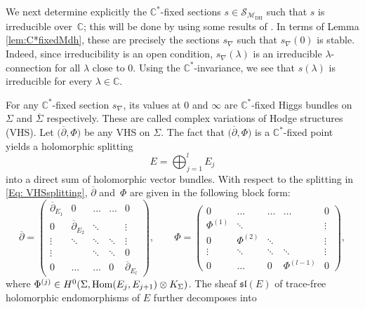 \documentclass[pdftex]{sigma}
\numberwithin{equation}{section}
\theoremstyle{definition}
\newcommand\C{{\mathbb C}}
\begin{document}
We next determine explicitly the $\C^*$-fixed sections $s \in \mathcal{S}_{\mathcal{M}_{\mathrm{DH}}}$ such that $s$
is irreducible over~$\C$; this will be done by using some results of \cite{CollierWentworth}. In terms of Lemma
\ref{lem:C*fixedMdh}, these are precisely the sections $s_\nabla$ such that $s_\nabla(0)$ is
stable. Indeed, since irreducibility is an open condition, $s_\nabla(\lambda)$ is an
irreducible $\lambda$-connection for all $\lambda$ close to $0$. Using the $\C^*$-invariance, we
see that $s(\lambda)$ is irreducible for every $\lambda \in \C$.

For any $\C^*$-fixed section $s_\nabla$, its values at $0$ and $\infty$ are $\C^*$-fixed Higgs
bundles on $\Sigma$ and $\overline{\Sigma}$ respectively.
These are called complex variations of Hodge structures (VHS).
Let $\bigl({\overline{\partial}}, \Phi\bigr)$ be any VHS on $\Sigma$.
The fact that $\bigl({\overline{\partial}}, \Phi\bigr)$ is a $\C^*$-fixed point yields a holomorphic splitting
\begin{equation}\label{Eq: VHSsplitting}
E = \bigoplus_{j=1}^lE_j
\end{equation}
into a direct sum of holomorphic vector bundles.
With respect to the splitting in \eqref{Eq: VHSsplitting}, ${\overline{\partial}}$ and~$\Phi$ are given in the
following block form:
\begin{equation}\label{Eq: VHSblockmatrices}
\overline{\partial} = \begin{pmatrix}
\overline{\partial}_{E_1} & 0 &\dots & \dots & 0\\
0 & \overline{\partial}_{E_2} & \ddots & & \vdots\\
\vdots & \ddots & \ddots & \ddots & \vdots\\
\vdots & & \ddots &\ddots & 0\\
0 & \dots & \dots & 0 & \overline{\partial}_{E_l}
\end{pmatrix},\qquad
\Phi = \begin{pmatrix}
0 & \dots & \dots & \dots & 0\\
\Phi^{(1)} & \ddots & & &\vdots\\
0 & \Phi^{(2)} & \ddots & &\vdots\\
\vdots & \ddots & \ddots & \ddots & \vdots\\
0 & \dots & 0 & \Phi^{(l-1)} & 0
\end{pmatrix},
\end{equation}
where $\Phi^{(j)} \in H^0(\Sigma, {\rm Hom}(E_j, E_{j+1})\otimes K_\Sigma)$.
The sheaf $\mathfrak{sl}(E)$ of trace-free holomorphic endomorphisms of $E$ further decomposes into
\end{document}
